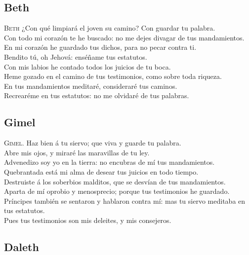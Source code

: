 \hypertarget{beth}{%
\subsection{Beth}\label{beth}}

 \textsc{Beth} ¿Con qué limpiará el joven su camino? Con
guardar tu palabra.\\
 Con todo mi corazón te he buscado: no me dejes divagar
de tus mandamientos.\\
 En mi corazón he guardado tus dichos, para no pecar
contra ti.\\
 Bendito tú, oh Jehová: enséñame tus estatutos.\\
 Con mis labios he contado todos los juicios de tu
boca.\\
 Heme gozado en el camino de tus testimonios, como sobre
toda riqueza.\\
 En tus mandamientos meditaré, consideraré tus caminos.\\
 Recrearéme en tus estatutos: no me olvidaré de tus
palabras.

\hypertarget{gimel}{%
\subsection{Gimel}\label{gimel}}

 \textsc{Gimel}. Haz bien á tu siervo; que viva y guarde
tu palabra.\\
 Abre mis ojos, y miraré las maravillas de tu ley.\\
 Advenedizo soy yo en la tierra: no encubras de mí tus
mandamientos.\\
 Quebrantada está mi alma de desear tus juicios en todo
tiempo.\\
 Destruiste á los soberbios malditos, que se desvían de
tus mandamientos.\\
 Aparta de mí oprobio y menosprecio; porque tus
testimonios he guardado.\\
 Príncipes también se sentaron y hablaron contra mí: mas
tu siervo meditaba en tus estatutos.\\
 Pues tus testimonios son mis deleites, y mis consejeros.

\hypertarget{daleth}{%
\subsection{Daleth}\label{daleth}}

